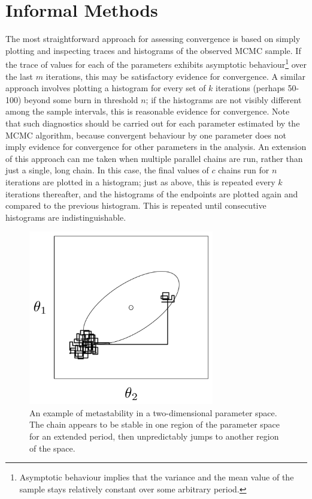 \documentclass[]{book}
\begin{document}
\section*{Informal Methods}

The most straightforward approach for assessing convergence is based on simply plotting and inspecting traces and histograms of the observed MCMC sample. If the trace of values for each of the parameters exhibits asymptotic behaviour\footnote{Asymptotic behaviour implies that the variance and the mean value of the sample stays relatively constant over some arbitrary period.} over the last $m$ iterations, this may be satisfactory evidence for convergence. A similar approach involves plotting a histogram for every set of $k$ iterations (perhaps 50-100) beyond some burn in threshold $n$; if the histograms are not visibly different among the sample intervals, this is reasonable evidence for convergence. Note that such diagnostics should be carried out for each parameter estimated by the MCMC algorithm, because convergent behaviour by one parameter does not imply evidence for convergence for other parameters in the analysis. An extension of this approach can me taken when multiple parallel chains are run, rather than just a single, long chain. In this case, the final values of $c$ chains run for $n$ iterations are plotted in a histogram; just as above, this is repeated every $k$ iterations thereafter, and the histograms of the endpoints are plotted again and compared to the previous histogram. This is repeated until consecutive histograms are indistinguishable.

\begin{figure}[h]
\begin{center}
\includegraphics[height=3in]{metastable.png}
\caption{An example of metastability in a two-dimensional parameter space. The chain appears to be stable in one region of the parameter space for an extended period, then unpredictably jumps to another region of the space.}
\label{fig:metas}
\end{center}
\end{figure}
\end{document}
